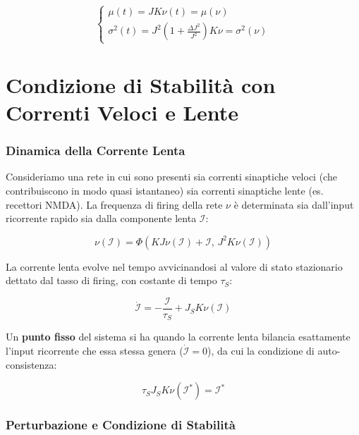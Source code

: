 \begin{equation}
\begin{cases}
\mu(t) = JK\nu(t) = \mu(\nu) \\
\sigma^2(t) = J^2\left(1 + \frac{\Delta J^2}{J^2}\right)K\nu = \sigma^2(\nu)
\end{cases}
\end{equation}

\section{Condizione di Stabilità con Correnti Veloci e Lente}

\subsubsection{Dinamica della Corrente Lenta}

Consideriamo una rete in cui sono presenti sia correnti sinaptiche veloci (che contribuiscono in modo quasi istantaneo) sia correnti sinaptiche lente (es. recettori NMDA). La frequenza di firing della rete $\nu$ è determinata sia dall'input ricorrente rapido sia dalla componente lenta $\mathcal{I}$:

\begin{equation}
\nu(\mathcal{I}) = \Phi\!\left(KJ\nu(\mathcal{I}) + \mathcal{I},\, J^2K\nu(\mathcal{I})\right)
\end{equation}

La corrente lenta evolve nel tempo avvicinandosi al valore di stato stazionario dettato dal tasso di firing, con costante di tempo $\tau_S$:

\begin{equation}
\dot{\mathcal{I}} = -\frac{\mathcal{I}}{\tau_S} + J_S K \nu(\mathcal{I})
\end{equation}

Un \textbf{punto fisso} del sistema si ha quando la corrente lenta bilancia esattamente l'input ricorrente che essa stessa genera ($\dot{\mathcal{I}} = 0$), da cui la condizione di auto-consistenza:

\begin{equation}
\tau_S J_S K \nu(\mathcal{I}^*) = \mathcal{I}^*
\end{equation}

\subsubsection{Perturbazione e Condizione di Stabilità}

